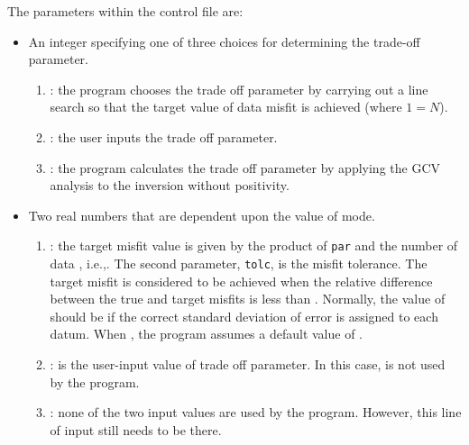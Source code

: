 The parameters within the control file are:
\begin{itemize}
\item[\fileName{mode}] An integer specifying one of three choices for determining the trade-off parameter.\\
\begin{enumerate}
\item {}: the program chooses the trade off parameter by carrying out a line search so that the target value of data misfit is achieved (where $1=N$).
\item {}: the user inputs the trade off parameter.
\item {}: the program calculates the trade off parameter by applying the GCV analysis to the inversion without positivity.
\end{enumerate}
\item[\fileName{par,tolc}] Two real numbers that are dependent upon the value of mode.
\begin{enumerate}
\item {}: the target misfit value is given by the product of \texttt{par} and the number of data , i.e.,. The second parameter, \texttt{tolc}, is the misfit tolerance. The target misfit is considered to be achieved when the relative difference between the true and target misfits is less than . Normally, the value of  should be  if the correct standard deviation of error is assigned to each datum. When , the program assumes a default value of .
\item {}:  is the user-input value of trade off parameter. In this case,  is not used by the program.
\item {}: none of the two input values are used by the program. However, this line of input still needs to be there.
\end{enumerate}


\end{itemize}
